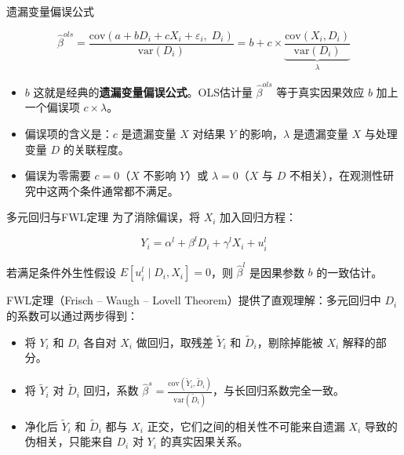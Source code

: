 \begin{frame}{遗漏变量偏误公式}

\begin{equation*}
\hat{\beta}^{ols} = \frac{\text{cov}(a + bD_i + cX_i + \varepsilon_i,\; D_i)}{\text{var}(D_i)} = b + c \times \underbrace{\frac{\text{cov}(X_i, D_i)}{\text{var}(D_i)}}_{\lambda}
\end{equation*}

\begin{itemize}
  \item $b$ 这就是经典的\textbf{遗漏变量偏误公式}。OLS估计量 $\hat{\beta}^{ols}$ 等于真实因果效应 $b$ 加上一个偏误项 $c \times \lambda$。
  \item 偏误项的含义是：$c$ 是遗漏变量 $X$ 对结果 $Y$ 的影响，$\lambda$ 是遗漏变量 $X$ 与处理变量 $D$ 的关联程度。
  \item 偏误为零需要 $c=0$（$X$ 不影响 $Y$）或 $\lambda=0$（$X$ 与 $D$ 不相关），在观测性研究中这两个条件通常都不满足。
\end{itemize}
\end{frame}


\begin{frame}{ 多元回归与FWL定理}
为了消除偏误，将 $X_i$ 加入回归方程：

\begin{equation}
  Y_i = \alpha^l + \beta^l D_i + \gamma^l X_i + u_i^l
\end{equation}

若满足条件外生性假设 $E[u_i^l \mid D_i, X_i] = 0$，则 $\hat{\beta}^l$ 是因果参数 $b$ 的一致估计。

FWL定理（Frisch -- Waugh -- Lovell Theorem）提供了直观理解：多元回归中 $D_i$ 的系数可以通过两步得到：

\begin{itemize}
  \item 将 $Y_i$ 和 $D_i$ 各自对 $X_i$ 做回归，取残差 $\tilde{Y}_i$ 和 $\tilde{D}_i$，剔除掉能被 $X_i$ 解释的部分。
  \item 将 $\tilde{Y}_i$ 对 $\tilde{D}_i$ 回归，系数 $\hat{\beta}^s = \frac{\text{cov}(\tilde{Y}_i, \tilde{D}_i)}{\text{var}(\tilde{D}_i)}$，与长回归系数完全一致。
  \item 净化后 $\tilde{Y}_i$ 和 $\tilde{D}_i$ 都与 $X_i$ 正交，它们之间的相关性不可能来自遗漏 $X_i$ 导致的伪相关，只能来自 $D_i$ 对 $Y_i$ 的真实因果关系。
\end{itemize}
\end{frame}

